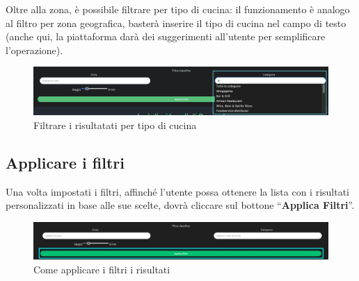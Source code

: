 Oltre alla zona, è possibile filtrare per tipo di cucina: il funzionamento è analogo al filtro per zona geografica, basterà inserire il tipo di cucina nel campo di testo (anche qui, la piattaforma darà dei suggerimenti all'utente per semplificare l'operazione).

\begin{figure}[H]
\centering
\includegraphics[scale=0.4]{./images/Homepage/FiltriCucina.png} 
\caption{Filtrare i risultatati per tipo di cucina}
\end{figure}

\subsection{Applicare i filtri}

Una volta impostati i filtri, affinché l’utente possa ottenere la lista con i risultati personalizzati in base alle sue scelte, dovrà cliccare sul bottone “\textbf{Applica Filtri}”.

\begin{figure}[H]
\centering
\includegraphics[scale=0.15]{./images/Homepage/ApplicaFiltri.png} 
\caption{Come applicare i filtri i risultati}
\end{figure}